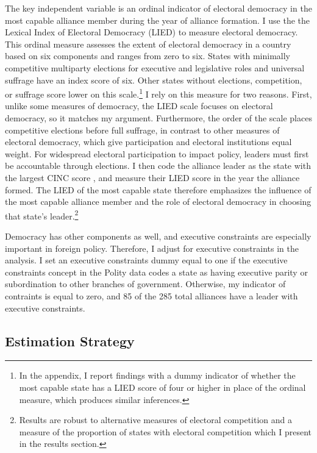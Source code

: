 \documentclass[12pt]{article}
\begin{document}
The key independent variable is an ordinal indicator of electoral democracy in the most capable alliance member during the year of alliance formation. 
I use the the Lexical Index of Electoral Democracy (LIED) \citep{Skaaningetal2015} to measure electoral democracy.
This ordinal measure assesses the extent of electoral democracy in a country based on six components and ranges from zero to six.  
States with minimally competitive multiparty elections for executive and legislative roles and universal suffrage have an index score of six.
Other states without elections, competition, or suffrage score lower on this scale.\footnote{In the appendix, I report findings with a dummy indicator of whether the most capable state has a LIED score of four or higher in place of the ordinal measure, which produces similar inferences.}
I rely on this measure for two reasons. 
First, unlike some measures of democracy, the LIED scale focuses on electoral democracy, so it matches my argument.
Furthermore, the order of the scale places competitive elections before full suffrage, in contrast to other measures of electoral democracy, which give participation and electoral institutions equal weight. 
For widespread electoral participation to impact policy, leaders must first be accountable through elections. 
I then code the alliance leader as the state with the largest CINC score \citep{SingerCINC1988}, and measure their LIED score in the year the alliance formed.
The LIED of the most capable state therefore emphasizes the influence of the most capable alliance member and the role of electoral democracy in choosing that state's leader.\footnote{Results are robust to alternative measures of electoral competition and a measure of the proportion of states with electoral competition which I present in the results section.}  


Democracy has other components as well, and executive constraints are especially important in foreign policy. 
Therefore, I adjust for executive constraints in the analysis.
I set an executive constraints dummy equal to one if the executive constraints concept in the Polity data codes a state as having executive parity or subordination to other branches of government.
Otherwise, my indicator of contraints is equal to zero, and 85 of the 285 total alliances have a leader with executive constraints.




\subsection{Estimation Strategy}
\end{document}
